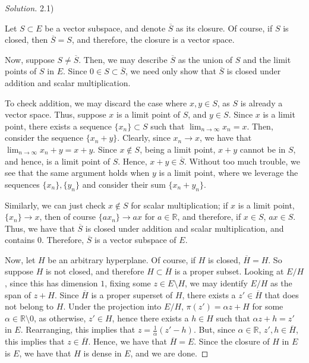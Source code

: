 \documentclass[10pt]{article}
\begin{document}
\begin{proof}[Solution]

2.1)

Let $S \subset E$ be a vector subspace, and denote $\overline{S}$ as its closure. Of course, if $S$ is closed, then $\overline{S} = S$, and therefore, the closure is a vector space.

Now, suppose $S \not= \overline{S}$. Then, we may describe $\overline{S}$ as the union of $S$ and the limit points of $S$ in $E$. Since $0 \in S \subset \overline{S}$, we need only show that $\overline{S}$ is closed under addition and scalar multiplication.

To check addition, we may discard the case where $x, y \in S$, as $S$ is already a vector space. Thus, suppose $x$ is a limit point of $S$, and $y \in S$. Since $x$ is a limit point, there exists a sequence $\{ x_n \} \subset S$ such that $\lim_{n \to \infty} x_n = x$. Then, consider the sequence $\{ x_n + y \}$. Clearly, since $x_n \to x$, we have that $\lim_{n \to \infty} x_n + y = x + y$. Since $x \not \in S$, being a limit point, $x + y$ cannot be in $S$, and hence, is a limit point of $S$. Hence, $x + y \in \overline{S}$. Without too much trouble, we see that the same argument holds when $y$ is a limit point, where we leverage the sequences $\{ x_n \}, \{ y_n \}$ and consider their sum $\{ x_n + y_n \}$.

Similarly, we can just check $x \not \in S$ for scalar multiplication; if $x$ is a limit point, $\{  x_n \} \to x$, then of course $\{ a x_n \} \to ax $ for $a \in \mathbb{R}$, and therefore, if $x \in S$, $ax \in S$. Thus, we have that $\overline{S}$ is closed under addition and scalar multiplication, and contains 0. Therefore, $\overline{S}$ is a vector subspace of $E$.

Now, let $H$ be an arbitrary hyperplane. Of course, if $H$ is closed, $\overline{H} = H$. So suppose $H$ is not closed, and therefore $H \subset \overline{H}$ is a proper subset. Looking at $E/H$, since this has dimension $1$, fixing some $z \in E \setminus H$, we may identify $E/H$ as the span of $z + H$. Since $\overline{H}$ is a proper superset of $H$, there exists a $z' \in \overline{H}$ that does not belong to $H$. Under the projection into $E/H$, $\pi(z') = \alpha z + H$ for some $\alpha \in \mathbb{R} \setminus 0$, as otherwise, $z' \in H$, hence there exists a $h \in H$ such that $\alpha z + h = z'$ in $E$. Rearranging, this implies that $z = \frac{1}{\alpha}(z' - h)$. But, since $\alpha \in \mathbb{R}$, $z', h \in \overline{H}$, this implies that $z \in \overline{H}$. Hence, we have that $\overline{H} = E$. Since the closure of $H$ in $E$ is $E$, we have that $H$ is dense in $E$, and we are done.


\end{proof}
\end{document}
